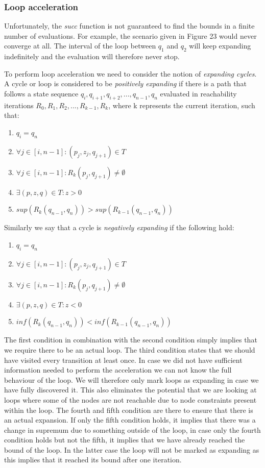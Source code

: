 \documentclass[12pt]{article}
\begin{document}
\subsubsection{Loop acceleration}
\label{sec:accel}
Unfortunately, the \textit{succ} function is not guaranteed to find the bounds in a finite number of evaluations. For example, the scenario given in Figure 23 would never converge at all. The interval of the loop between $q_1$ and $q_2$ will keep expanding indefinitely and the evaluation will therefore never stop.

To perform loop acceleration we need to consider the notion of \textit{expanding cycles}. A cycle or loop is considered to be \textit{positively expanding} if there is a path that follows a state sequence $q_i, q_{i+1}, q_{i+2}, ..., q_{n-1}, q_n$ evaluated in reachability iterations $R_0, R_{1}, R_{2}, ..., R_{k-1}, R_{k}$, where k represents the current iteration, such that:
\begin{enumerate}
	\item $q_i = q_n$
	\item $\forall j \in [i, n-1]: (p_j, z_j, q_{j+1}) \in T$
	\item $\forall j \in [i, n-1]: R_k(p_j, q_{j+1}) \ne \emptyset$
	\item $\exists (p, z, q) \in T: z > 0$
	\item $sup(R_k(q_{n-1}, q_{n})) > sup(R_{k-1}(q_{n-1}, q_n))$
\end{enumerate}

Similarly we say that a cycle is \textit{negatively expanding} if the following hold:
\begin{enumerate}
	\item $q_i = q_n$
	\item $\forall j \in [i, n-1] : (p_j, z_j, q_{j+1}) \in T$
	\item $\forall j \in [i, n-1]: R_k(p_j, q_{j+1}) \ne \emptyset$
	\item $\exists (p, z, q) \in T: z < 0$
	\item $inf(R_k(q_{n-1}, q_{n})) < inf(R_{k-1}(q_{n-1}, q_n))$
\end{enumerate}

The first condition in combination with the second condition simply implies that we require there to be an actual loop. The third condition states that we should have visited every transition at least once. In case we did not have sufficient information needed to perform the acceleration we can not know the full behaviour of the loop. We will therefore only mark loops as expanding in case we have fully discovered it. This also eliminates the potential that we are looking at loops where some of the nodes are not reachable due to node constraints present within the loop. The fourth and fifth condition are there to ensure that there is an actual expansion. If only the fifth condition holds, it implies that there was a change in supremum due to something outside of the loop, in case only the fourth condition holds but not the fifth, it implies that we have already reached the bound of the loop. In the latter case the loop will not be marked as expanding as this implies that it reached its bound after one iteration.
\end{document}
